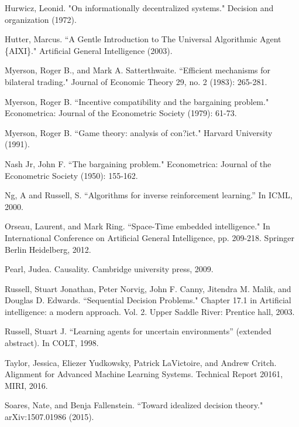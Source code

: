 \documentclass{article}  %
\begin{document}
\begin{thebibliography}{99}
 Hurwicz, Leonid. "On informationally decentralized systems." Decision and organization (1972).

 Hutter, Marcus. ``A Gentle Introduction to The Universal Algorithmic Agent \{AIXI\}." Artificial General Intelligence (2003).

 Myerson, Roger B., and Mark A. Satterthwaite. ``Efficient mechanisms for bilateral trading." Journal of 
Economic Theory 29, no. 2 (1983): 265-281.

 Myerson, Roger B. ``Incentive compatibility and the bargaining problem." Econometrica: Journal of the Econometric Society (1979): 61-73.

 Myerson, Roger B. ``Game theory: analysis of con?ict." Harvard University (1991).

 Nash Jr, John F. ``The bargaining problem." Econometrica: Journal of the Econometric Society (1950): 155-162.

 Ng, A and Russell, S.  ``Algorithms for inverse reinforcement learning.'' In ICML, 2000.

 Orseau, Laurent, and Mark Ring. ``Space-Time embedded intelligence." In International Conference on Artificial General Intelligence, pp. 209-218. Springer Berlin Heidelberg, 2012.

  Pearl, Judea. Causality. Cambridge university press, 2009.

 Russell, Stuart Jonathan, Peter Norvig, John F. Canny, Jitendra M. Malik, and Douglas D. Edwards. ``Sequential Decision Problems."  Chapter 17.1 in Artificial intelligence: a modern approach. Vol. 2. Upper Saddle River: Prentice hall, 2003. 

 Russell, Stuart J.  ``Learning agents for uncertain environments'' (extended abstract). In COLT, 1998.

 Taylor, Jessica, Eliezer Yudkowsky, Patrick LaVictoire, and Andrew Critch. Alignment for Advanced Machine Learning Systems. Technical Report 20161, MIRI, 2016.

 Soares, Nate, and Benja Fallenstein. ``Toward idealized decision theory." arXiv:1507.01986 (2015).





\end{thebibliography}
\end{document}
